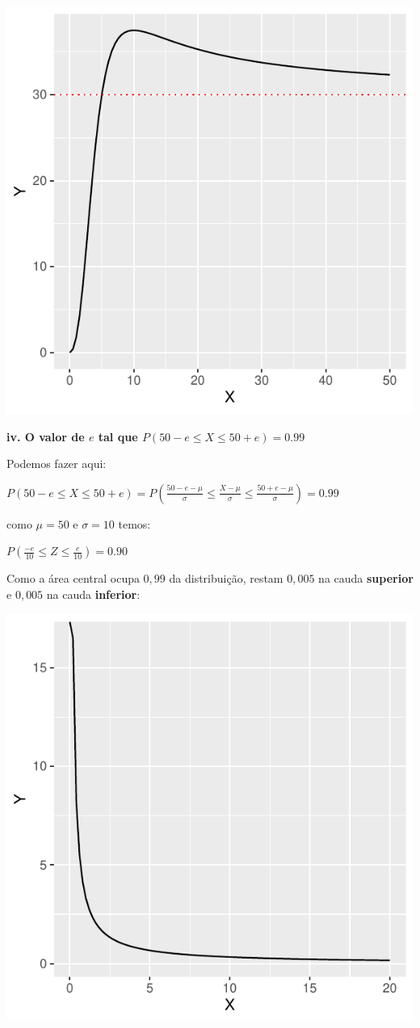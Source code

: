 \documentclass[
]{book}
\begin{document}
\includegraphics{probest-cambientais_files/figure-latex/unnamed-chunk-219-1.pdf}

\textbf{iv. O valor de \(e\) tal que \(P(50-e \le X \le 50+e) = 0.99\)}

Podemos fazer aqui:

\(P(50-e \le X \le 50+e) = P(\frac{50-e - \mu}{\sigma} \le \frac{X-\mu}{\sigma} \le \frac{50+e-\mu}{\sigma}) = 0.99\)

como \(\mu = 50\) e \(\sigma = 10\) temos:

\(P(\frac{-e}{10} \le Z \le \frac{e}{10}) = 0.90\)

Como a área central ocupa \(0,99\) da distribuição, restam \(0,005\) na cauda \textbf{superior} e \(0,005\) na cauda \textbf{inferior}:

\includegraphics{probest-cambientais_files/figure-latex/unnamed-chunk-220-1.pdf}
\end{document}
